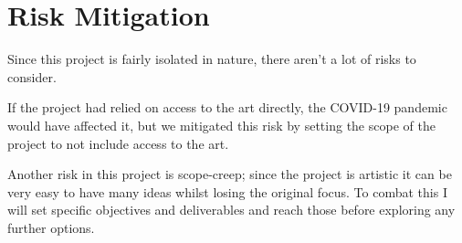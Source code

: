 \section{Risk Mitigation}
Since this project is fairly isolated in nature, there aren't a lot of risks to
consider.

If the project had relied on access to the art directly, the COVID-19 pandemic
would have affected it, but we mitigated this risk by setting the scope of the
project to not include access to the art.

Another risk in this project is scope-creep; since the project is artistic it
can be very easy to have many ideas whilst losing the original focus. To combat
this I will set specific objectives and deliverables and reach those before
exploring any further options.
